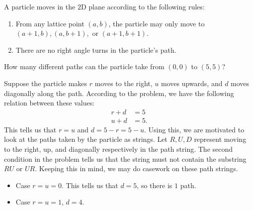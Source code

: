 \documentclass[a4paper, 12pt]{article}
\begin{document}
\begin{chirpbox}
    \begin{problemnum}
        A particle moves in the \( 2 \)D plane according to the following rules:
        \begin{enumerate}
            \item From any lattice point \( (a, b) \), the particle may only move to \( (a+1,b), (a, b+1), \) or \( (a+1,b+1) \).
            \item There are no right angle turns in the particle's path.
        \end{enumerate}
        How many different paths can the particle take from \( (0,0) \) to \( (5,5) \)?
    \end{problemnum}
\end{chirpbox}

\begin{solution}
    Suppose the particle makes \( r \) moves to the right, \( u \) moves upwards, and \( d \) moves diagonally along the path. According to the problem, we have the following relation between these values:
    \begin{align*}
        r + d &= 5 \\
        u + d &= 5
    .\end{align*}
    This tells us that \( r = u \) and \( d = 5 - r = 5 - u \). Using this, we are motivated to look at the paths taken by the particle as strings. Let \( R, U, D \) represent moving to the right, up, and diagonally respectively in the path string. The second condition in the problem tells us that the string must not contain the substring \( RU \) or \( UR \). Keeping this in mind, we may do casework on these path strings.
    \begin{itemize}
        \item Case  \( r = u = 0 \). This tells us that \( d = 5 \), so there is \( 1 \) path.
        \item Case \( r = u = 1 \), \( d = 4 \).
    \end{itemize}
\end{solution}
\end{document}
